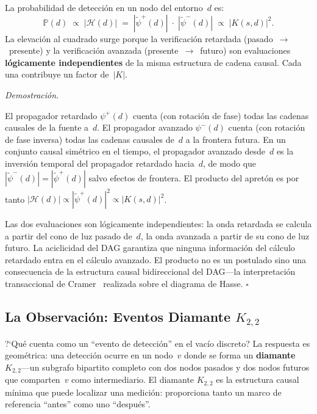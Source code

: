 \documentclass[11pt, a4paper, openany]{book}
\renewenvironment{proof}[1][Demostraci\'on]{%
  \par\noindent\textit{#1.}\quad
}{\hfill$\square$\par\medskip}
\begin{document}
\begin{theorem}
\label{thm:born-rule}
La probabilidad de detecci\'on en un nodo del entorno~$d$ es:
\begin{equation}
  \boxed{\;
  \mathbb{P}(d) \;\propto\; |\mathcal{H}(d)|
  \;=\; |\widetilde{\psi}^{+}(d)| \;\cdot\;
        |\widetilde{\psi}^{-}(d)|
  \;\propto\; |K(s,d)|^2.
  \;}
  \label{eq:born-rule}
\end{equation}
La elevaci\'on al cuadrado surge porque la verificaci\'on retardada
(pasado~$\to$~presente) y la verificaci\'on avanzada
(presente~$\to$~futuro) son evaluaciones \textbf{l\'ogicamente
independientes} de la misma estructura de cadena causal. Cada una
contribuye un factor de~$|K|$.
\end{theorem}

\begin{proof}
El propagador retardado $\psi^{+}(d)$ cuenta (con rotaci\'on de fase)
todas las cadenas causales de la fuente a~$d$. El propagador avanzado
$\psi^{-}(d)$ cuenta (con rotaci\'on de fase inversa) todas las cadenas
causales de~$d$ a la frontera futura. En un conjunto causal
sim\'etrico en el tiempo, el propagador avanzado desde~$d$ es la
inversi\'on temporal del propagador retardado hacia~$d$, de modo que
$|\widetilde{\psi}^{-}(d)| = |\widetilde{\psi}^{+}(d)|$ salvo efectos
de frontera. El producto del apret\'on es por tanto
$|\mathcal{H}(d)| \propto |\widetilde{\psi}^{+}(d)|^2
\propto |K(s,d)|^2$.

Las dos evaluaciones son l\'ogicamente independientes: la onda
retardada se calcula a partir del cono de luz pasado de~$d$, la onda
avanzada a partir de su cono de luz futuro. La aciclicidad del DAG
garantiza que ninguna informaci\'on del c\'alculo retardado entra en
el c\'alculo avanzado. El producto no es un postulado sino una
consecuencia de la estructura causal bidireccional del
DAG---la interpretaci\'on transaccional de
Cramer~\cite{cramer1986} realizada sobre el diagrama de Hasse.
\end{proof}

\subsection{La Observaci\'on: Eventos Diamante $K_{2,2}$}

?`Qu\'e cuenta como un ``evento de detecci\'on'' en el vac\'io
discreto? La respuesta es geom\'etrica: una detecci\'on ocurre en un
nodo~$v$ donde se forma un \textbf{diamante $K_{2,2}$}---un subgrafo
bipartito completo con dos nodos pasados y dos nodos futuros que
comparten~$v$ como intermediario. El diamante $K_{2,2}$ es la
estructura causal m\'inima que puede localizar una medici\'on:
proporciona tanto un marco de referencia ``antes'' como uno ``despu\'es''.
\end{document}

